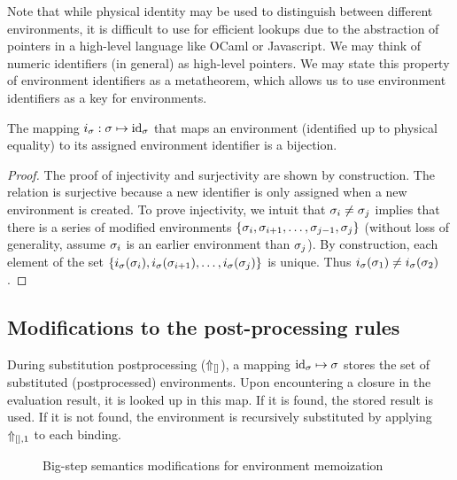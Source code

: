 Note that while physical identity may be used to distinguish between different environments, it is difficult to use for efficient lookups due to the abstraction of pointers in a high-level language like OCaml or Javascript. We may think of numeric identifiers (in general) as high-level pointers. We may state this property of environment identifiers as a metatheorem, which allows us to use environment identifiers as a key for environments.

\begin{theorem}
  The mapping $i_\sigma:\sigma\mapsto\text{id}_\sigma$ that maps an environment (identified up to physical equality) to its assigned environment identifier is a bijection.
\end{theorem}

\begin{proof}
  The proof of injectivity and surjectivity are shown by construction. The relation is surjective because a new identifier is only assigned when a new environment is created. To prove injectivity, we intuit that $\sigma_i\ne\sigma_j$ implies that there is a series of modified environments $\{\sigma_i,\sigma_{i+1},\dots,\sigma_{j-1},\sigma_j\}$ (without loss of generality, assume $\sigma_i$ is an earlier environment than $\sigma_j$). By construction, each element of the set $\{i_\sigma(\sigma_i),i_\sigma(\sigma_{i+1}),\dots,i_\sigma(\sigma_j)\}$ is unique. Thus $i_\sigma(\sigma_1)\ne i_\sigma(\sigma_2)$.
\end{proof}

\subsection{Modifications to the post-processing rules}
\label{sec:memoization-postprocessing}

During substitution postprocessing ($\Uparrow_{[]}$), a mapping $\text{id}_\sigma\mapsto\sigma$ stores the set of substituted (postprocessed) environments. Upon encountering a closure in the evaluation result, it is looked up in this map. If it is found, the stored result is used. If it is not found, the environment is recursively substituted by applying $\Uparrow_{[],1}$ to each binding.


\begin{figure}
  \centering
  \begin{mdframed}
    \begin{singlespace}
      
    \end{singlespace}
  \end{mdframed}
  \caption{Big-step semantics modifications for environment memoization}
  \label{fig:big-step-memoization-rules}
\end{figure}

